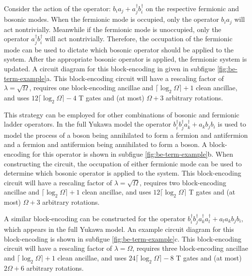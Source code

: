 Consider the action of the operator: $b_i a_j + a_j^\dagger b_i^\dagger$ on the respective fermionic and bosonic modes.
When the fermionic mode is occupied, only the operator $b_i a_j$ will act nontrivially.
Meanwhile if the fermionic mode is unoccupied, only the operator $a_j^\dagger b_i^\dagger$ will act nontrivially.
Therefore, the occupation of the fermionic mode can be used to dictate which bosonic operator should be applied to the system.
After the appropriate bosonic operator is applied, the fermionic system is updated.
A circuit diagram for this block-encoding in given in subfigue \ref{fig:be-term-example}a.
This block-encoding circuit will have a rescaling factor of $\lambda = \sqrt{\Omega}$, requires one block-encoding ancillae and $\lceil \log_2\Omega \rceil + 1$ clean ancillae, and uses  $12 \lceil \log_2 \Omega \rceil - 4$ T gates and (at most) $\Omega + 3$ arbitrary rotations.

This strategy can be employed for other combinations of bosonic and fermionic ladder operators.
In the full Yukawa model the operator $b_i^\dagger b_j^\dagger a_k^\dagger + a_k b_j b_i$ is used to model the process of a boson being annihilated to form a fermion and antifermion and a fermion and antifermion being annihilated to form a boson.
A block-encoding for this operator is shown in subfigue \ref{fig:be-term-example}b.
When constructing the circuit, the occupation of either fermionic mode can be used to determine which bosonic operator is applied to the system.
This block-encoding circuit will have a rescaling factor of $\lambda = \sqrt{\Omega}$, requires two block-encoding ancillae and $\lceil \log_2\Omega \rceil + 1$ clean ancillae, and uses  $12 \lceil \log_2 \Omega \rceil$ T gates and (at most) $\Omega + 3$ arbitrary rotations.

A similar block-encoding can be constructed for the operator $b_i^\dagger b_j^\dagger a_k^\dagger a_l^\dagger + a_l a_k b_j b_i$, which appears in the full Yukawa model.
An example circuit diagram for this block-encoding is shown in subfigue \ref{fig:be-term-example}c.
This block-encoding circuit will have a rescaling factor of $\lambda = \Omega$, requires three block-encoding ancillae and $\lceil \log_2\Omega \rceil + 1$ clean ancillae, and uses  $24 \lceil \log_2\Omega \rceil - 8$ T gates and (at most) $2\Omega + 6$ arbitrary rotations.

